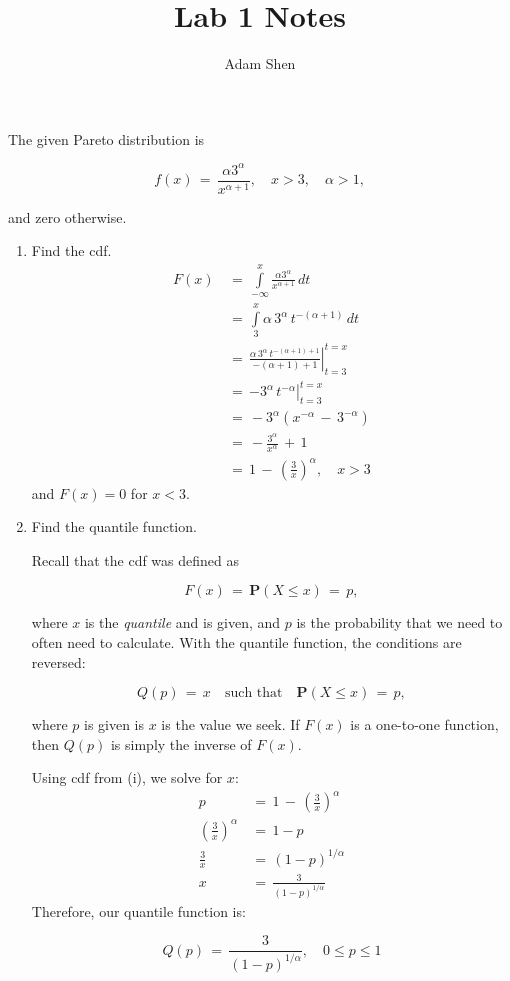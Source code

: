 \documentclass[11pt,letterpaper]{article}
\title{Lab 1 Notes}
\author{Adam Shen}
\date{}
\newcommand{\Prob}[1]{\mathbf{P}\left(#1\right)}
\newcommand{\blue}[1]{{\color{blue}#1}}
\begin{document}
\maketitle

The given Pareto distribution is

\[f(x) \,=\, \frac{\alpha 3^{\alpha}}{x^{\alpha+1}}, \quad x > 3, \quad \alpha > 1,\]

and zero otherwise.

\begin{enumerate}[label=(\roman*)]
\item Find the cdf.
\blue{
\begin{align*}
F(x) \,&=\, \int\limits_{-\infty}^{x}\frac{\alpha 3^{\alpha}}{x^{\alpha+1}}\,dt\\[3mm]
\,&=\, \int\limits_{3}^{x}\alpha\,3^{\alpha}\,t^{-(\alpha + 1)}\,dt\\[3mm]
\,&=\, \left. \frac{\alpha\,3^{\alpha}\,t^{-(\alpha + 1) + 1}}{-(\alpha + 1) + 1} \right|_{t=3}^{t=x}\\[3mm]
\,&=\, \left. -3^{\alpha}\,t^{-\alpha}\right|_{t=3}^{t=x}\\[3mm]
\,&=\, -3^{\alpha}(x^{-\alpha} \,-\, 3^{-\alpha})\\[3mm]
\,&=\, -\frac{3^{\alpha}}{x^{\alpha}} \,+\, 1\\[3mm]
\,&=\, 1 \,-\, \left(\frac{3}{x}\right)^{\alpha}, \quad x > 3
\end{align*}
and $F(x) = 0$ for $x < 3$.
}

\item Find the quantile function.

Recall that the cdf was defined as

\[F(x) \,=\, \Prob{X \leq x} \,=\, p,\]

where $x$ is the \emph{quantile} and is given, and $p$ is the probability that we need to often
need to calculate. With the quantile function, the conditions are reversed:

\[Q(p) \,=\, x \quad\text{such that}\quad \Prob{X \leq x} \,=\, p,\]

where $p$ is given is $x$ is the value we seek. If $F(x)$ is a one-to-one function, then $Q(p)$ is
simply the inverse of $F(x)$.

\blue{
Using cdf from (i), we solve for $x$:
\begin{align*}
p \,&=\, 1 \,-\, \left(\frac{3}{x}\right)^{\alpha}\\[3mm]
\left(\frac{3}{x}\right)^{\alpha} \,&=\, 1-p\\[3mm]
\frac{3}{x} \,&=\, (1-p)^{1/\alpha}\\[3mm]
x \,&=\, \frac{3}{(1-p)^{1/\alpha}}
\end{align*}
Therefore, our quantile function is:

\[Q(p) \,=\, \frac{3}{(1-p)^{1/\alpha}}, \quad 0 \leq p \leq 1\]
}
\end{enumerate}
\end{document}
